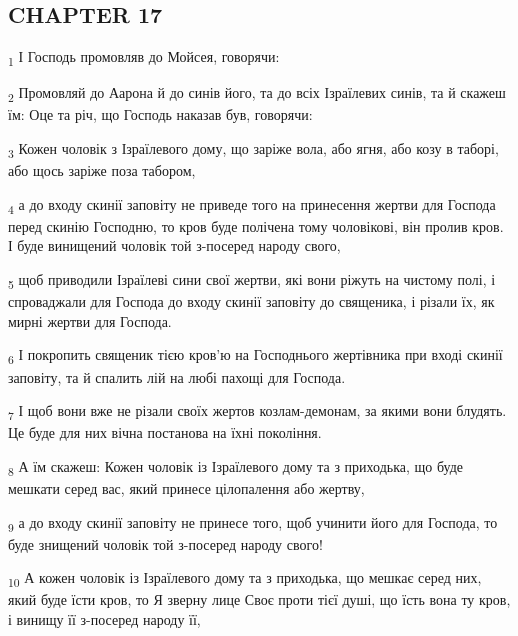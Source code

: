 \subsection{CHAPTER 17}
\begin{tcolorbox}
\textsubscript{1} І Господь промовляв до Мойсея, говорячи:
\end{tcolorbox}
\begin{tcolorbox}
\textsubscript{2} Промовляй до Аарона й до синів його, та до всіх Ізраїлевих синів, та й скажеш їм: Оце та річ, що Господь наказав був, говорячи:
\end{tcolorbox}
\begin{tcolorbox}
\textsubscript{3} Кожен чоловік з Ізраїлевого дому, що заріже вола, або ягня, або козу в таборі, або щось заріже поза табором,
\end{tcolorbox}
\begin{tcolorbox}
\textsubscript{4} а до входу скинії заповіту не приведе того на принесення жертви для Господа перед скинію Господню, то кров буде полічена тому чоловікові, він пролив кров. І буде винищений чоловік той з-посеред народу свого,
\end{tcolorbox}
\begin{tcolorbox}
\textsubscript{5} щоб приводили Ізраїлеві сини свої жертви, які вони ріжуть на чистому полі, і спроваджали для Господа до входу скинії заповіту до священика, і різали їх, як мирні жертви для Господа.
\end{tcolorbox}
\begin{tcolorbox}
\textsubscript{6} І покропить священик тією кров'ю на Господнього жертівника при вході скинії заповіту, та й спалить лій на любі пахощі для Господа.
\end{tcolorbox}
\begin{tcolorbox}
\textsubscript{7} І щоб вони вже не різали своїх жертов козлам-демонам, за якими вони блудять. Це буде для них вічна постанова на їхні покоління.
\end{tcolorbox}
\begin{tcolorbox}
\textsubscript{8} А їм скажеш: Кожен чоловік із Ізраїлевого дому та з приходька, що буде мешкати серед вас, який принесе цілопалення або жертву,
\end{tcolorbox}
\begin{tcolorbox}
\textsubscript{9} а до входу скинії заповіту не принесе того, щоб учинити його для Господа, то буде знищений чоловік той з-посеред народу свого!
\end{tcolorbox}
\begin{tcolorbox}
\textsubscript{10} А кожен чоловік із Ізраїлевого дому та з приходька, що мешкає серед них, який буде їсти кров, то Я зверну лице Своє проти тієї душі, що їсть вона ту кров, і винищу її з-посеред народу її,
\end{tcolorbox}
